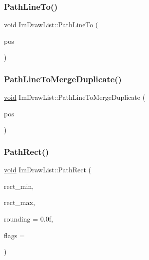\mbox{\label{structImDrawList_a828d944325ed58d8b57abd3647bffaaf}} 
\subsubsection{\texorpdfstring{Path\+Line\+To()}{PathLineTo()}}
{\footnotesize\ttfamily \hyperlink{imgui__impl__opengl3__loader_8h_ac668e7cffd9e2e9cfee428b9b2f34fa7}{void} Im\+Draw\+List\+::\+Path\+Line\+To (\begin{DoxyParamCaption}\item[{const \hyperlink{structImVec2}{Im\+Vec2} \&}]{pos }\end{DoxyParamCaption})\hspace{0.3cm}{\ttfamily [inline]}}

\mbox{\label{structImDrawList_aa3dd11945fb62495f8b9e1392ed724e3}} 
\subsubsection{\texorpdfstring{Path\+Line\+To\+Merge\+Duplicate()}{PathLineToMergeDuplicate()}}
{\footnotesize\ttfamily \hyperlink{imgui__impl__opengl3__loader_8h_ac668e7cffd9e2e9cfee428b9b2f34fa7}{void} Im\+Draw\+List\+::\+Path\+Line\+To\+Merge\+Duplicate (\begin{DoxyParamCaption}\item[{const \hyperlink{structImVec2}{Im\+Vec2} \&}]{pos }\end{DoxyParamCaption})\hspace{0.3cm}{\ttfamily [inline]}}

\mbox{\label{structImDrawList_a2251eb264ed8b17a253c409787375053}} 
\subsubsection{\texorpdfstring{Path\+Rect()}{PathRect()}}
{\footnotesize\ttfamily \hyperlink{imgui__impl__opengl3__loader_8h_ac668e7cffd9e2e9cfee428b9b2f34fa7}{void} Im\+Draw\+List\+::\+Path\+Rect (\begin{DoxyParamCaption}\item[{const \hyperlink{structImVec2}{Im\+Vec2} \&}]{rect\+\_\+min,  }\item[{const \hyperlink{structImVec2}{Im\+Vec2} \&}]{rect\+\_\+max,  }\item[{float}]{rounding = {\ttfamily 0.0f},  }\item[{Im\+Draw\+Flags}]{flags = {} }\end{DoxyParamCaption})}

